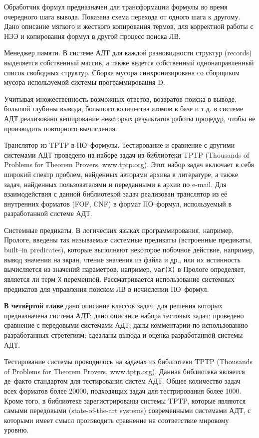 \documentclass[a4paper]{report}
\begin{document}
Обработчик формул предназначен для трансформации формулы во время очередного шага вывода. Показана схема перехода от одного шага к другому. Дано описание мягкого и жесткого копирования термов, для корректной работы с НЭЭ и копирования формул в другой процесс поиска ЛВ.

Менеджер памяти. В системе АДТ для каждой разновидности структур (records) выделяется собственный массив, а также ведется собственный однонаправленный список свободных структур. Сборка мусора синхронизирована со сборщиком мусора используемой системы программирования D.

Учитывая множественность возможных ответов, возвратов поиска в выводе, большой глубины вывода, большого количества атомов в базе и т.д. в системе АДТ реализовано кеширование некоторых результатов работы процедур, чтобы не производить повторного вычисления.

Транслятор из TPTP в ПО--формулы. Тестирование и сравнение с другими системами АДТ проведено на наборе задач из библиотеки TPTP (Thousands of Problems for Theorem Provers, www.tptp.org). Этот набор задач включает в себя широкий спектр проблем, найденных авторами архива в литературе, а также задач, найденных пользователями и переданными в архив по e-mail. Для взаимодействия с данной библиотекой задач реализован транслятор из её внутренних форматов (FOF, CNF) в формат ПО--формул, используемый в разработанной системе АДТ.

Системные предикаты. В логических языках программирования, например, Прологе, введены так называемые системные предикаты (встроенные предикаты, built--in predicates), которые выполняют некоторое побочное действие, например, вывод значения на экран, чтение значения из файла и др., или их истинность вычисляется из значений параметров, например, \texttt{var(X)} в Прологе определяет, является ли терм \texttt{X} переменной. Рассматривается использование системных предикатов для управления поиском ЛВ в исчислении ПО--формул.


\textbf{В четвёртой главе} дано описание классов задач, для решения которых предназначена система АДТ; дано описание набора тестовых задач; проведено сравнение с передовыми системами АДТ; даны комментарии по использованию разработанных стретегиям; сдеаланы вывода и оценка разработанной системы АДТ.

Тестирование системы проводилось на задачах из библиотеки TPTP (Thousands of Problems for Theorem Provers, www.tptp.org). Данная библиотека является де--факто стандартом для тестирования систем АДТ. Общее количество задач всех форматов более 20000, подходящих задач для тестрирования более 1000. Кроме того,  в библиотеке зарегистрированы системы TPTP, которые являются самыми передовыми (state-of-the-art systems) современными системами АДТ, с которыми имеет смысл производить сравнение на соответствие мировому уровню.
\end{document}
